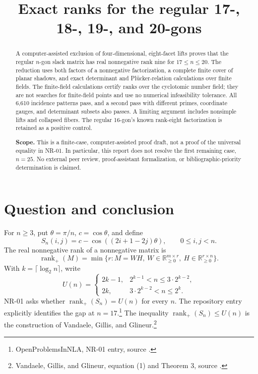 \documentclass[11pt]{article}
\title{Exact ranks for the regular 17-, 18-, 19-, and 20-gons}
\author{}
\date{}
\theoremstyle{definition}
\newcommand{\rankp}{\operatorname{rank}_{+}}
\newcommand{\R}{\mathbb R}
\begin{document}
\maketitle
\vspace{-1.5em}
\begin{abstract}
A computer-assisted exclusion of four-dimensional, eight-facet lifts proves that the regular $n$-gon slack matrix has real nonnegative rank nine for $17\le n\le20$. The reduction uses both factors of a nonnegative factorization, a complete finite cover of planar shadows, and exact determinant and Pl\"ucker-relation calculations over finite fields. The finite-field calculations certify ranks over the cyclotomic number field; they are not searches for finite-field points and use no numerical infeasibility tolerance. All 6,610 incidence patterns pass, and a second pass with different primes, coordinate gauges, and determinant subsets also passes. A limiting argument includes nonsimple lifts and collapsed fibers. The regular 16-gon's known rank-eight factorization is retained as a positive control.

\textbf{Scope.} This is a finite-case, computer-assisted proof draft, not a proof of the universal equality in NR-01. In particular, this report does not resolve the first remaining case, $n=25$. No external peer review, proof-assistant formalization, or bibliographic-priority determination is claimed.
\end{abstract}

\section{Question and conclusion}
For $n\ge3$, put $\theta=\pi/n$, $c=\cos\theta$, and define
\begin{equation}\label{eq:slack}
 S_n(i,j)=c-\cos((2i+1-2j)\theta),\qquad 0\le i,j<n.
\end{equation}
The real nonnegative rank of a nonnegative matrix is
\[
 \rankp(M)=\min\{r:M=WH,\ W\in\R_{\ge0}^{m\times r},\ H\in\R_{\ge0}^{r\times n}\}.
\]
With $k=\lceil\log_2n\rceil$, write
\begin{equation}\label{eq:upper}
 U(n)=\begin{cases}
 2k-1,&2^{k-1}<n\le3\cdot2^{k-2},\\
 2k,&3\cdot2^{k-2}<n\le2^k.
 \end{cases}
\end{equation}
NR-01 asks whether $\rankp(S_n)=U(n)$ for every $n$. The repository entry explicitly identifies the gap at $n=17$.\footnote{OpenProblemsInNLA, NR-01 entry, source \cite{repo}.} The inequality $\rankp(S_n)\le U(n)$ is the construction of Vandaele, Gillis, and Glineur.\footnote{Vandaele, Gillis, and Glineur, equation (1) and Theorem 3, source \cite{vgg}.}
\end{document}

